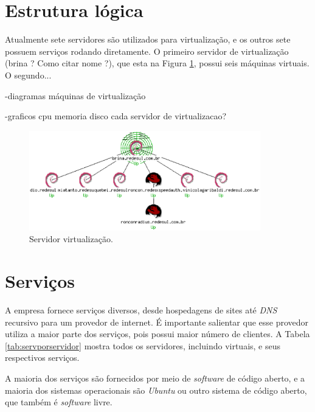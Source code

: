 \section{Estrutura lógica}
\label{section:estlog}

Atualmente sete servidores são utilizados para virtualização, e os outros sete possuem serviços rodando diretamente. O primeiro servidor 
de virtualização (brina ? Como citar nome ?), que esta na Figura \ref{fig:servlog_1}, possui seis máquinas virtuais.
O segundo...

-diagramas máquinas de virtualização

-graficos cpu memoria disco cada servidor de virtualizacao?

\begin{figure}[servlog_1]
 \centering
 \includegraphics[width=380px]{img/servlog_1.eps}
 \caption{Servidor virtualização.}
 \label{fig:servlog_1}
\end{figure}

\section{Serviços}
\label{section:serv}

A empresa fornece serviços diversos, desde hospedagens de sites até \textit{DNS} recursivo para um provedor de internet. É importante
salientar que esse provedor utiliza a maior parte dos serviços, pois possui maior número de clientes.
A Tabela \ref{tab:servporservidor} mostra todos os servidores, incluindo virtuais, e seus respectivos serviços.

A maioria dos serviços são fornecidos por meio de \textit{software} de código aberto, e a maioria dos sistemas operacionais são \textit{Ubuntu}
ou outro sistema de código aberto, que também é \textit{software} livre.

